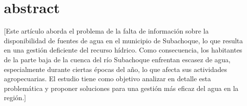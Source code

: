 \documentclass[draft]{agujournal2019}
\begin{document}



%
%

%
%


\section{abstract}
[Este artículo aborda el problema de la falta de información sobre la disponibilidad de fuentes de agua en el municipio de Subachoque, lo que resulta en una gestión deficiente del recurso hídrico. Como consecuencia, los habitantes de la parte baja de la cuenca del río Subachoque enfrentan escasez de agua, especialmente durante ciertas épocas del año, lo que afecta sus actividades agropecuarias. El estudio tiene como objetivo analizar en detalle esta problemática y proponer soluciones para una gestión más eficaz del agua en la región.]
\end{document}

